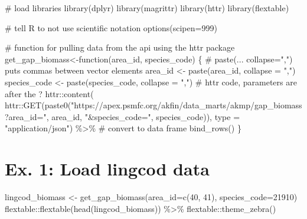 \documentclass[
  letterpaper,
  oneside,
  open=any]{scrbook}
\newenvironment{Shaded}{\begin{snugshade}}{\end{snugshade}}
\newcommand{\AttributeTok}[1]{\textcolor[rgb]{0.40,0.45,0.13}{#1}}
\newcommand{\CommentTok}[1]{\textcolor[rgb]{0.37,0.37,0.37}{#1}}
\newcommand{\ControlFlowTok}[1]{\textcolor[rgb]{0.00,0.23,0.31}{#1}}
\newcommand{\DecValTok}[1]{\textcolor[rgb]{0.68,0.00,0.00}{#1}}
\newcommand{\FunctionTok}[1]{\textcolor[rgb]{0.28,0.35,0.67}{#1}}
\newcommand{\NormalTok}[1]{\textcolor[rgb]{0.00,0.23,0.31}{#1}}
\newcommand{\OtherTok}[1]{\textcolor[rgb]{0.00,0.23,0.31}{#1}}
\newcommand{\SpecialCharTok}[1]{\textcolor[rgb]{0.37,0.37,0.37}{#1}}
\newcommand{\StringTok}[1]{\textcolor[rgb]{0.13,0.47,0.30}{#1}}
\begin{document}
\begin{Shaded}
\begin{Highlighting}[]
\CommentTok{\# load libraries}
\FunctionTok{library}\NormalTok{(dplyr)}
\FunctionTok{library}\NormalTok{(magrittr)}
\FunctionTok{library}\NormalTok{(httr)}
\FunctionTok{library}\NormalTok{(flextable)}

\CommentTok{\# tell R to not use scientific notation}
\FunctionTok{options}\NormalTok{(}\AttributeTok{scipen=}\DecValTok{999}\NormalTok{)}

\CommentTok{\# function for pulling data from the api using the httr package}
\NormalTok{get\_gap\_biomass}\OtherTok{\textless{}{-}}\ControlFlowTok{function}\NormalTok{(area\_id, species\_code) \{}
  \CommentTok{\# paste(... collapse=",") puts commas between vector elements}
\NormalTok{  area\_id }\OtherTok{\textless{}{-}} \FunctionTok{paste}\NormalTok{(area\_id, }\AttributeTok{collapse =} \StringTok{","}\NormalTok{)}
\NormalTok{  species\_code }\OtherTok{\textless{}{-}} \FunctionTok{paste}\NormalTok{(species\_code, }\AttributeTok{collapse =} \StringTok{","}\NormalTok{)}
  \CommentTok{\# httr code, parameters are after the \textquotesingle{}?\textquotesingle{}}
\NormalTok{  httr}\SpecialCharTok{::}\FunctionTok{content}\NormalTok{(}
\NormalTok{    httr}\SpecialCharTok{::}\FunctionTok{GET}\NormalTok{(}\FunctionTok{paste0}\NormalTok{(}\StringTok{"https://apex.psmfc.org/akfin/data\_marts/akmp/gap\_biomass?area\_id="}\NormalTok{,}
\NormalTok{                     area\_id,}
                     \StringTok{"\&species\_code="}\NormalTok{,}
\NormalTok{                     species\_code)),}
    \AttributeTok{type =} \StringTok{"application/json"}\NormalTok{) }\SpecialCharTok{\%\textgreater{}\%}
    \CommentTok{\# convert to data frame}
    \FunctionTok{bind\_rows}\NormalTok{()}
\NormalTok{\}}
\end{Highlighting}
\end{Shaded}

\hypertarget{ex.-1-load-lingcod-data}{%
\section{Ex. 1: Load lingcod data}\label{ex.-1-load-lingcod-data}}

\begin{Shaded}
\begin{Highlighting}[]
\NormalTok{lingcod\_biomass }\OtherTok{\textless{}{-}} \FunctionTok{get\_gap\_biomass}\NormalTok{(}\AttributeTok{area\_id=}\FunctionTok{c}\NormalTok{(}\DecValTok{40}\NormalTok{, }\DecValTok{41}\NormalTok{), }\AttributeTok{species\_code=}\DecValTok{21910}\NormalTok{)}
\NormalTok{flextable}\SpecialCharTok{::}\FunctionTok{flextable}\NormalTok{(}\FunctionTok{head}\NormalTok{(lingcod\_biomass)) }\SpecialCharTok{\%\textgreater{}\%}
\NormalTok{  flextable}\SpecialCharTok{::}\FunctionTok{theme\_zebra}\NormalTok{()}
\end{Highlighting}
\end{Shaded}
\end{document}
